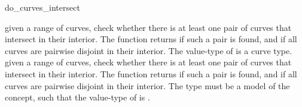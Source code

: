 \ccRefPageBegin

\begin{ccRefFunction}{do_curves_intersect}


{given a range of curves, check whether there is at least one pair of curves
 that intersect in their interior. The function returns  if such
 a pair is found, and  if all curves are pairwise disjoint in
 their interior. The value-type of  is a curve type.}
\ccGlue
{}
{given a range of curves, check whether there is at least one pair of curves
 that intersect in their interior. The function returns  if such
 a pair is found, and  if all curves are pairwise disjoint in
 their interior. The  type must be a model
 of the  concept, such that the value-type of
  is .}
 
\end{ccRefFunction}

\ccRefPageEnd


